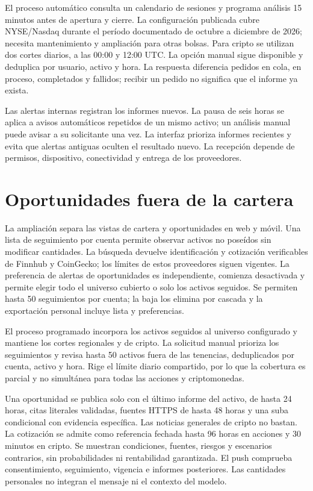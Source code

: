 El proceso automático consulta un calendario de sesiones y programa análisis 15 minutos antes de apertura y cierre. La configuración publicada cubre NYSE/Nasdaq durante el período documentado de octubre a diciembre de 2026; necesita mantenimiento y ampliación para otras bolsas. Para cripto se utilizan dos cortes diarios, a las 00:00 y 12:00 UTC. La opción manual sigue disponible y deduplica por usuario, activo y hora. La respuesta diferencia pedidos en cola, en proceso, completados y fallidos; recibir un pedido no significa que el informe ya exista.

Las alertas internas registran los informes nuevos. La pausa de seis horas se aplica a avisos automáticos repetidos de un mismo activo; un análisis manual puede avisar a su solicitante una vez. La interfaz prioriza informes recientes y evita que alertas antiguas oculten el resultado nuevo. La recepción depende de permisos, dispositivo, conectividad y entrega de los proveedores.

\section{Oportunidades fuera de la cartera}\label{sec:oportunidades}

La ampliación separa las vistas de cartera y oportunidades en web y móvil. Una lista de seguimiento por cuenta permite observar activos no poseídos sin modificar cantidades. La búsqueda devuelve identificación y cotización verificables de Finnhub y CoinGecko; los límites de estos proveedores siguen vigentes. La preferencia de alertas de oportunidades es independiente, comienza desactivada y permite elegir todo el universo cubierto o solo los activos seguidos. Se permiten hasta 50 seguimientos por cuenta; la baja los elimina por cascada y la exportación personal incluye lista y preferencias.

El proceso programado incorpora los activos seguidos al universo configurado y mantiene los cortes regionales y de cripto. La solicitud manual prioriza los seguimientos y revisa hasta 50 activos fuera de las tenencias, deduplicados por cuenta, activo y hora. Rige el límite diario compartido, por lo que la cobertura es parcial y no simultánea para todas las acciones y criptomonedas.

Una oportunidad se publica solo con el último informe del activo, de hasta 24 horas, citas literales validadas, fuentes HTTPS de hasta 48 horas y una suba condicional con evidencia específica. Las noticias generales de cripto no bastan. La cotización se admite como referencia fechada hasta 96 horas en acciones y 30 minutos en cripto. Se muestran condiciones, fuentes, riesgos y escenarios contrarios, sin probabilidades ni rentabilidad garantizada. El push comprueba consentimiento, seguimiento, vigencia e informes posteriores. Las cantidades personales no integran el mensaje ni el contexto del modelo.
